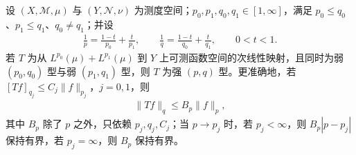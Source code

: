 \documentclass[../../main.tex]{subfiles}
\begin{document}
\begin{theorem}\label{theorem:ch06-marcinkiewicz}
设 $(X,\mathscr M,\mu)$ 与 $(Y,\mathscr N,\nu)$ 为测度空间；$p_0,p_1,q_0,q_1\in[1,\infty]$，满足 $p_0\leqslant q_0$、$p_1\leqslant q_1$、$q_0\ne q_1$；并设
\begin{align*}
\frac1p=\frac{1-t}{p_0}+\frac t{p_1},\qquad
\frac1q=\frac{1-t}{q_0}+\frac t{q_1},\qquad 0<t<1.
\end{align*}
若 $T$ 为从 $L^{p_0}(\mu)+L^{p_1}(\mu)$ 到 $Y$ 上可测函数空间的次线性映射，且同时为弱 $(p_0,q_0)$ 型与弱 $(p_1,q_1)$ 型，则 $T$ 为强 $(p,q)$ 型。更准确地，若 $[Tf]_{q_j}\leqslant C_j\|f\|_{p_j}$，$j=0,1$，则
\begin{align*}
\|Tf\|_q\leqslant B_p\|f\|_p,
\end{align*}
其中 $B_p$ 除了 $p$ 之外，只依赖 $p_j,q_j,C_j$；当 $p\to p_j$ 时，若 $p_j<\infty$，则 $B_p|p-p_j|$ 保持有界，若 $p_j=\infty$，则 $B_p$ 保持有界。
\end{theorem}
\end{document}
